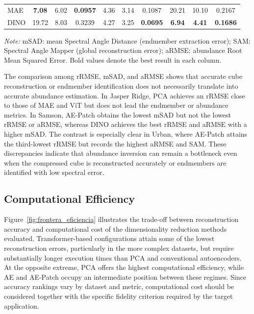 \documentclass{article}
\begin{document}
\begin{table}[htbp]
\begin{tabular}{l ccc ccc ccc}
        MAE       & \textbf{7.08} & 6.02          & \textbf{0.0957} & 4.36          & 3.14          & 0.1087          & 20.21         & 10.10         & 0.2167 \\
        DINO      & 19.72         & 8.03          & 0.3239          & 4.27          & 3.25          & \textbf{0.0695} & \textbf{6.94} & \textbf{4.41} & \textbf{0.1686} \\
        \bottomrule
    \end{tabular}
    \par\smallskip
    \begin{minipage}{\textwidth}
        \footnotesize
        \textit{Note:} mSAD: mean Spectral Angle Distance (endmember extraction error); SAM: Spectral Angle Mapper (global reconstruction error); aRMSE: abundance Root Mean Squared Error. Bold values denote the best result in each column.
    \end{minipage}
\end{table}

The comparison among rRMSE, mSAD, and aRMSE shows that accurate cube reconstruction or endmember identification does not necessarily translate into accurate abundance estimation. In Jasper Ridge, PCA achieves an rRMSE close to those of MAE and ViT but does not lead the endmember or abundance metrics. In Samson, AE-Patch obtains the lowest mSAD but not the lowest rRMSE or aRMSE, whereas DINO achieves the best rRMSE and aRMSE with a higher mSAD. The contrast is especially clear in Urban, where AE-Patch attains the third-lowest rRMSE but records the highest aRMSE and SAM. These discrepancies indicate that abundance inversion can remain a bottleneck even when the compressed cube is reconstructed accurately or endmembers are identified with low spectral error.

\subsection{Computational Efficiency}
\label{subsec:frontera_eficiencia}

Figure~\ref{fig:frontera_eficiencia} illustrates the trade-off between reconstruction accuracy and computational cost of the dimensionality reduction methods evaluated. Transformer-based configurations attain some of the lowest reconstruction errors, particularly in the more complex datasets, but require substantially longer execution times than PCA and conventional autoencoders. At the opposite extreme, PCA offers the highest computational efficiency, while AE and AE-Patch occupy an intermediate position between these regimes. Since accuracy rankings vary by dataset and metric, computational cost should be considered together with the specific fidelity criterion required by the target application.
\end{document}

